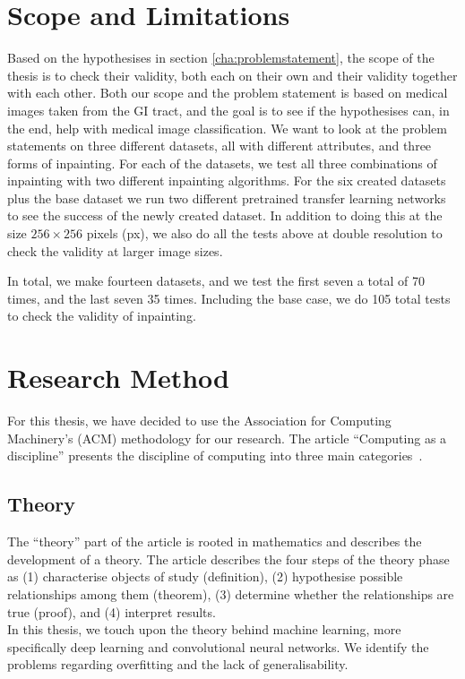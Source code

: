 \section{Scope and Limitations}
Based on the hypothesises in section \ref{cha:problemstatement}, the scope of the thesis is to check their validity, both each on their own and their validity together with each other. 
Both our scope and the problem statement is based on medical images taken from the GI tract, and the goal is to see if the hypothesises can, in the end, help with medical image classification.
We want to look at the problem statements on three different datasets, all with different attributes, and three forms of inpainting.
For each of the datasets, we test all three combinations of inpainting with two different inpainting algorithms. 
For the six created datasets plus the base dataset we run two different pretrained transfer learning networks to see the success of the newly created dataset.
In addition to doing this at the size $256 \times 256$ pixels (px), we also do all the tests above at double resolution to check the validity at larger image sizes.

In total, we make fourteen datasets, and we test the first seven a total of 70 times, and the last seven 35 times. Including the base case, we do 105 total tests to check the validity of inpainting.


\section{Research Method}
For this thesis, we have decided to use the Association for Computing Machinery's (ACM) methodology for our research. The article ``Computing as a discipline'' presents the discipline of computing into three main categories~\cite{Denning:1989:CD:63238.63239}. 
\subsection{Theory}
The ``theory'' part of the article is rooted in mathematics and describes the development of a theory. The article describes the four steps of the theory phase as (1) characterise objects of study (definition), (2) hypothesise
possible relationships among them (theorem), (3) determine whether the
relationships are true (proof), and (4) interpret results.\\

In this thesis, we touch upon the theory behind machine learning, more specifically deep learning and convolutional neural networks. We identify the problems regarding overfitting and the lack of generalisability.




